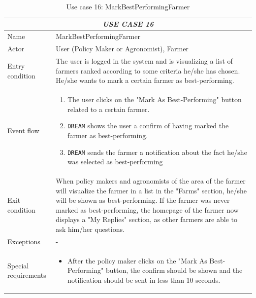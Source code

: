 \documentclass{article}
\begin{document}
\centering
\begin{longtable}{|p{3.5cm}|m{8cm}|}
\caption{Use case 16: MarkBestPerformingFarmer}
 \label{uc16}
 \hline
 \multicolumn{2}{|c|}{\cellcolor{white}\emph{USE CASE 16}} \\
 \endfirsthead
 \endhead
 \endfoot
 \endlastfoot
 \hline
 Name & MarkBestPerformingFarmer\\
 \hline
 Actor & User (Policy Maker or Agronomist), Farmer\\
 \hline
 Entry condition & The user is logged in the system and is visualizing a list of farmers ranked according to some criteria he/she has chosen. He/she wants to mark a certain farmer as best-performing.\\
 \hline
 Event flow & \begin{enumerate}
    \item The user clicks on the "Mark As Best-Performing" button related to a certain farmer.
    \item \verb|DREAM| shows the user a confirm of having marked the farmer as best-performing.
    \item \verb|DREAM| sends the farmer a notification about the fact he/she was selected as best-performing
 \end{enumerate}\\
 \hline
 Exit condition &  When policy makers and agronomists of the area of the farmer will visualize the farmer in a list in the "Farms" section, he/she will be shown as best-performing.
 If the farmer was never marked as best-performing, the homepage of the farmer now displays a "My Replies" section, as other farmers are able to ask him/her questions.\\
 \hline
 Exceptions & -\\
 \hline
 Special requirements &\begin{itemize}
     \item After the policy maker clicks on the "Mark As Best-Performing" button, the confirm should be shown and the notification should be sent in less than 10 seconds.
 \end{itemize}\\
 \hline
\end{longtable}
\end{document}
